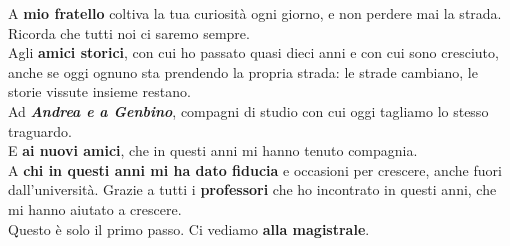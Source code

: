 \noindent A \textbf{mio fratello} coltiva la tua curiosità ogni giorno, e non perdere mai la strada. Ricorda che tutti noi ci saremo sempre.\\

\medskip
\noindent Agli \textbf{amici storici}, con cui ho passato quasi dieci anni e con cui sono cresciuto, anche se oggi ognuno sta prendendo la propria strada: le strade cambiano, le storie vissute insieme restano. \\
Ad \textbf{\textit{Andrea e a Genbino}}, compagni di studio con cui oggi tagliamo lo stesso traguardo. \\

\medskip
\noindent E \textbf{ai nuovi amici}, che in questi anni mi hanno tenuto compagnia.\\

\medskip
\noindent A \textbf{chi in questi anni mi ha dato fiducia} e occasioni per crescere, anche fuori dall'università. Grazie a tutti i \textbf{professori} che ho incontrato in questi anni, che mi hanno aiutato a crescere. \\


\medskip
\noindent Questo è solo il primo passo. Ci vediamo \textbf{alla magistrale}.